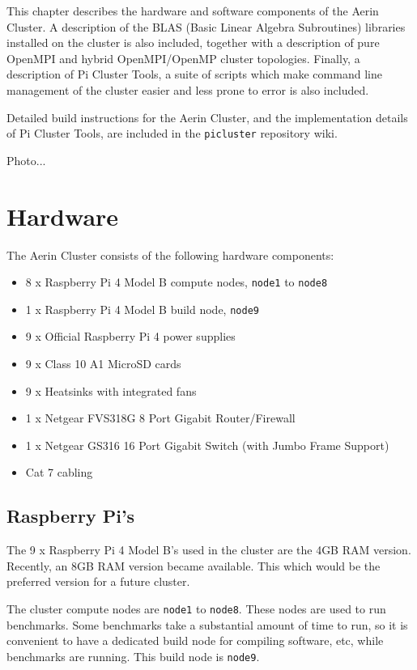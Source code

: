 This chapter describes the hardware and software components of the Aerin Cluster. A description of the BLAS (Basic Linear Algebra Subroutines) libraries installed on the cluster is also included, together with a description of pure OpenMPI and hybrid OpenMPI/OpenMP cluster topologies. Finally, a description of Pi Cluster Tools, a suite of scripts which make command line management of the cluster easier and less prone to error is also included. 

Detailed build instructions for the Aerin Cluster, and the implementation details of Pi Cluster Tools, are included in the \verb|picluster| repository wiki. 

Photo...


%
%
\section{Hardware}

The Aerin Cluster consists of the following hardware components:

\begin{itemize}
  \item 8 x Raspberry Pi 4 Model B compute nodes, \verb|node1| to \verb|node8|
  \item 1 x Raspberry Pi 4 Model B build node, \verb|node9|
  \item 9 x Official Raspberry Pi 4 power supplies
  \item 9 x Class 10 A1 MicroSD cards
  \item 9 x Heatsinks with integrated fans
  \item 1 x Netgear FVS318G 8 Port Gigabit Router/Firewall
  \item 1 x Netgear GS316 16 Port Gigabit Switch (with Jumbo Frame Support)
  \item Cat 7 cabling
\end{itemize}


%
%
\subsection{Raspberry Pi's}
The 9 x Raspberry Pi 4 Model B's used in the cluster are the 4GB RAM version. Recently, an 8GB RAM version became available. This which would be the preferred version for a future cluster.

The cluster compute nodes are \verb|node1| to \verb|node8|. These nodes are used to run benchmarks. Some benchmarks take a substantial amount of time to run, so it is convenient to have a dedicated build node for compiling software, etc, while benchmarks are running. This build node is \verb|node9|.


